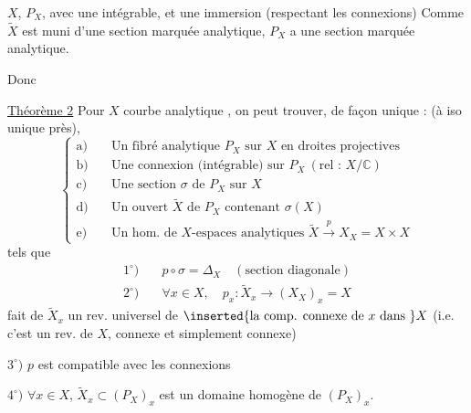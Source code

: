 $X$, $P_X$, avec une  intégrable, et une immersion  (respectant les connexions)
Comme $\widetilde X$ est muni d'une section marquée analytique, $P_X$ a une section marquée analytique.

Donc

\uline{Théorème 2} Pour $X$ courbe analytique , on peut trouver, de façon unique :
(à iso unique près),
\[
\left\{\begin{aligned}
\text{a)}\quad&\text{Un fibré analytique }P_X\text{ sur }X\text{ en droites projectives}\\
\text{b)}\quad&\text{Une connexion (intégrable) sur }P_X\ (\text{rel : }X/\mathbb C)\\
\text{c)}\quad&\text{Une section }\sigma\text{ de }P_X\text{ sur }X\\
\text{d)}\quad&\text{Un ouvert }\widetilde X\text{ de }P_X\text{ contenant }\sigma(X)\\
\text{e)}\quad&\text{Un hom. de }X\text{-espaces analytiques }\widetilde X\xrightarrow{p}X_X=X\times X
\end{aligned}\right.
\]
tels que
\[
\begin{aligned}
1^\circ)\quad&p\circ\sigma=\Delta_X\quad(\text{section diagonale})\\
2^\circ)\quad&\forall x\in X,\quad p_x:\widetilde X_x\longrightarrow(X_X)_x=X
\end{aligned}
\]
fait de $\widetilde X_x$ un rev. universel de $\inserted{\text{la comp. connexe de }x\text{ dans }}X$ (i.e. c'est un rev. de $X$, connexe et simplement connexe)

$3^\circ)$ $p$ est compatible avec les connexions

$4^\circ)$ $\forall x\in X$, $\widetilde X_x\subset(P_X)_x$ est un domaine homogène de $(P_X)_x$.

